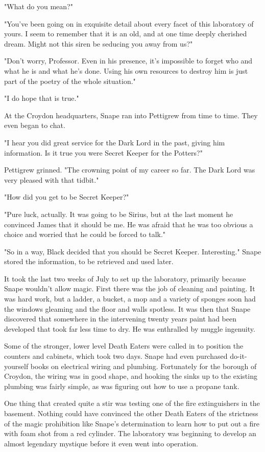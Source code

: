 "What do you mean?"

"You've been going on in exquisite detail about every facet of this laboratory of yours. I seem to remember that it is an old, and at one time deeply cherished dream. Might not this siren be seducing you away from us?"

"Don't worry, Professor. Even in his presence, it's impossible to forget who and what he is and what he's done. Using his own resources to destroy him is just part of the poetry of the whole situation."

"I do hope that is true."

At the Croydon headquarters, Snape ran into Pettigrew from time to time. They even began to chat.

"I hear you did great service for the Dark Lord in the past, giving him information. Is it true you were Secret Keeper for the Potters?"

Pettigrew grinned. "The crowning point of my career so far. The Dark Lord was very pleased with that tidbit."

"How did you get to be Secret Keeper?"

"Pure luck, actually. It was going to be Sirius, but at the last moment he convinced James that it should be me. He was afraid that he was too obvious a choice and worried that he could be forced to talk."

"So in a way, Black decided that you should be Secret Keeper. Interesting." Snape stored the information, to be retrieved and used later.

It took the last two weeks of July to set up the laboratory, primarily because Snape wouldn't allow magic. First there was the job of cleaning and painting. It was hard work, but a ladder, a bucket, a mop and a variety of sponges soon had the windows gleaming and the floor and walls spotless. It was then that Snape discovered that somewhere in the intervening twenty years paint had been developed that took far less time to dry. He was enthralled by muggle ingenuity.

Some of the stronger, lower level Death Eaters were called in to position the counters and cabinets, which took two days. Snape had even purchased do-it-yourself books on electrical wiring and plumbing. Fortunately for the borough of Croydon, the wiring was in good shape, and hooking the sinks up to the existing plumbing was fairly simple, as was figuring out how to use a propane tank.

One thing that created quite a stir was testing one of the fire extinguishers in the basement. Nothing could have convinced the other Death Eaters of the strictness of the magic prohibition like Snape's determination to learn how to put out a fire with foam shot from a red cylinder. The laboratory was beginning to develop an almost legendary mystique before it even went into operation.

